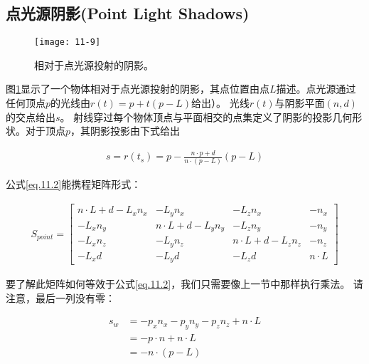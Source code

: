 \subsection{点光源阴影(Point Light Shadows)}
\begin{figure}[h]
    \texttt{[image: 11-9]}
    \centering
    \caption{相对于点光源投射的阴影。}
    \label{fig:11-9}
\end{figure}

\begin{flushleft}
图\ref{fig:11-9}显示了一个物体相对于点光源投射的阴影，其点位置由点$L$描述。点光源通过任何顶点$p$的光线由$r(t)=p+t(p-L)$给出）。 光线$r(t)$与阴影平面$(n,d)$的交点给出$s$。 射线穿过每个物体顶点与平面相交的点集定义了阴影的投影几何形状。对于顶点$p$，其阴影投影由下式给出\\
\end{flushleft}

\begin{align*}\tag{eq.11.2}\label{eq.11.2}
s=r(t_{s})=p-\frac{n\cdot p+d}{n\cdot (p-L)}(p-L)
\end{align*}

\begin{flushleft}
公式\ref{eq.11.2}能携程矩阵形式：\\
\end{flushleft}

\begin{align*}
S_{point}=\begin{bmatrix}
 n\cdot L+d-L_{x}n_{x} & -L_{y}n_{x} & -L_{z}n_{x} & -n_{x} \\
 -L_{x}n_{y} & n\cdot L+d-L_{y}n_{y} & -L_{z}n_{y} & -n_{y} \\
 -L_{x}n_{z} & -L_{y}n_{z} & n\cdot L+d-L_{z}n_{z} & -n_{z} \\
 -L_{x}d & -L_{y}d & -L_{z}d & n\cdot L
\end{bmatrix}
\end{align*}

\begin{flushleft}
要了解此矩阵如何等效于公式\ref{eq.11.2}，我们只需要像上一节中那样执行乘法。 请注意，最后一列没有零：\\
\end{flushleft}

\begin{align*}
s_{w}&=-p_{x}n_{x}-p_{y}n_{y}-p_{z}n_{z}+n\cdot L\\
&=-p\cdot n+n\cdot L\\
&=-n\cdot (p-L)
\end{align*}

